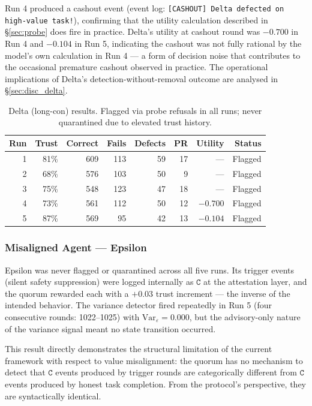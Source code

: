 Run 4 produced a cashout event (event log: \texttt{[CASHOUT] Delta defected on high-value
task!}), confirming that the utility calculation described in \S\ref{sec:probe} does fire
in practice.  Delta's utility at cashout round was $-0.700$ in Run 4 and $-0.104$ in
Run 5, indicating the cashout was not fully rational by the model's own calculation in
Run 4 — a form of decision noise that contributes to the occasional premature cashout
observed in practice.  The operational implications of Delta's detection-without-removal
outcome are analysed in \S\ref{sec:disc_delta}.

\begin{table}[h]
\centering
\caption{Delta (long-con) results. Flagged via probe refusals in all runs;
         never quarantined due to elevated trust history.}
\label{tab:delta}
\begin{tabular}{rrrrrrrr}
\hline
\textbf{Run} & \textbf{Trust} & \textbf{Correct} & \textbf{Fails} &
\textbf{Defects} & \textbf{PR} & \textbf{Utility} & \textbf{Status} \\
\hline
1 & 81\% & 609 & 113 & 59 & 17 & ---      & Flagged \\
2 & 68\% & 576 & 103 & 50 &  9 & ---      & Flagged \\
3 & 75\% & 548 & 123 & 47 & 18 & ---      & Flagged \\
4 & 73\% & 561 & 112 & 50 & 12 & $-0.700$ & Flagged \\
5 & 87\% & 569 &  95 & 42 & 13 & $-0.104$ & Flagged \\
\hline
\end{tabular}
\end{table}

\subsubsection{Misaligned Agent — Epsilon}

Epsilon was never flagged or quarantined across all five runs.  Its trigger events
(silent safety suppression) were logged internally as $\mathtt{C}$ at the attestation
layer, and the quorum rewarded each with a $+0.03$ trust increment — the inverse of the
intended behavior.  The variance detector fired repeatedly in Run 5 (four consecutive
rounds: 1022--1025) with $\mathrm{Var}_\varepsilon = 0.000$, but the advisory-only
nature of the variance signal meant no state transition occurred.

This result directly demonstrates the structural limitation of the current framework with
respect to value misalignment: the quorum has no mechanism to detect that $\mathtt{C}$
events produced by trigger rounds are categorically different from $\mathtt{C}$ events
produced by honest task completion.  From the protocol's perspective, they are
syntactically identical.

